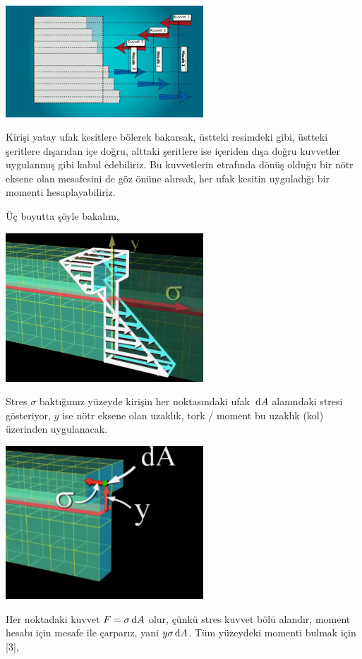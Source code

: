\documentclass[12pt,fleqn]{article}\usepackage{../../common}
\begin{document}
\includegraphics[width=20em]{phy_020_strs_01_09.jpg}

Kirişi yatay ufak kesitlere bölerek bakarsak, üstteki resimdeki gibi, üstteki
şeritlere dışarıdan içe doğru, alttaki şeritlere ise içeriden dışa doğru
kuvvetler uygulanmış gibi kabul edebiliriz. Bu kuvvetlerin etrafında dönüş
olduğu bir nötr eksene olan mesafesini de göz önüne alırsak, her ufak kesitin
uyguladığı bir momenti hesaplayabiliriz.

Üç boyutta şöyle bakalım,

\includegraphics[width=20em]{phy_020_strs_01_07.jpg}

Stres $\sigma$ baktığımız yüzeyde kirişin her noktasındaki ufak $\,\mathrm{d} A$
alanındaki stresi gösteriyor, $y$ ise nötr eksene olan uzaklık, tork / moment
bu uzaklık (kol) üzerinden uygulanacak.

\includegraphics[width=20em]{phy_020_strs_01_08.jpg}

Her noktadaki kuvvet $F = \sigma \,\mathrm{d} A$ olur, çünkü stres kuvvet bölü alandır,
moment hesabı için mesafe ile çarparız, yani $y \sigma \,\mathrm{d} A$. Tüm yüzeydeki
momenti bulmak için [3],
\end{document}
